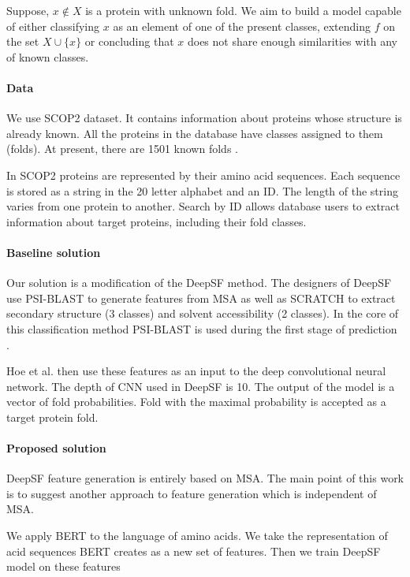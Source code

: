 \documentclass[12pt, twoside]{article}
\begin{document}
Suppose, $x \not\in X$ is a protein with unknown fold. We aim to build a model capable of either classifying $x$ as an element of one of the present classes, extending $f$ on the set $X \cup \{x\}$ or concluding that $x$ does not share enough similarities with any of known classes. 

\paragraph{Data}
\noindent
We use SCOP2 \cite{SCOP2FST, SCOP2SND} dataset. It contains information about proteins whose structure is already known. All the proteins in the database have classes assigned to them (folds).  At present, there are 1501 known folds \cite{SCOP2SND}. 

In SCOP2 proteins are represented by their amino acid sequences. Each sequence is stored as a string in the 20 letter alphabet and an ID. The length of the string varies from one protein to another. Search by ID allows database users to extract information about target proteins, including their fold classes. 

\paragraph{Baseline solution}
\noindent
Our solution is a modification of the DeepSF \cite{DeepSF} method. The designers of DeepSF use PSI-BLAST\cite{PSIBLAST} to generate features from MSA  as well as SCRATCH \cite{SCRATCH} to extract secondary structure (3 classes) and solvent accessibility (2 classes).  In the core of this classification method PSI-BLAST is used during the first stage of prediction \cite{SCRATCH}. 

Hoe et al. then use these features as an input to the deep convolutional neural network. The depth of CNN used in DeepSF is 10. The output of the model is a vector of fold probabilities. Fold with the maximal probability is accepted as a target protein fold. 

\paragraph{Proposed solution}
\noindent

DeepSF feature generation is entirely based on MSA. The main point of this work is to suggest another approach to feature generation which is independent of MSA. 

We apply BERT to the language of amino acids. We take the representation of acid sequences BERT creates as a new set of features. Then we train DeepSF model on these features
\end{document}
